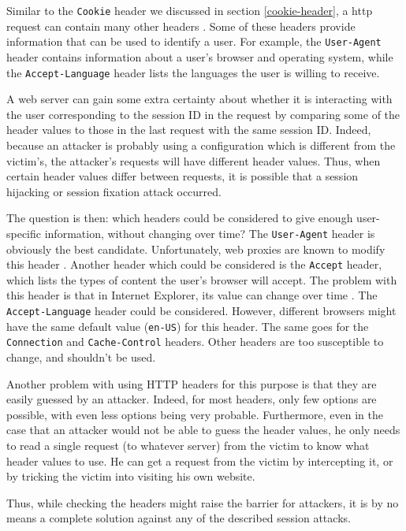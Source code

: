 Similar to the \texttt{Cookie} header we discussed in section \ref{cookie-header}, a \gls{http} request can contain many other headers \cite{rfc2616}. Some of these headers provide information that can be used to identify a user. For example, the \texttt{User-Agent} header contains information about a user's browser and operating system, while the \texttt{Accept-Language} header lists the languages the user is willing to receive.

A web server can gain some extra certainty about whether it is interacting with the user corresponding to the session ID in the request by comparing some of the header values to those in the last request with the same session ID. Indeed, because an attacker is probably using a configuration which is different from the victim's, the attacker's requests will have different header values. Thus, when certain header values differ between requests, it is possible that a session hijacking or session fixation attack occurred.

The question is then: which headers could be considered to give enough user-specific information, without changing over time? The \texttt{User-Agent} header is obviously the best candidate. Unfortunately, web proxies are known to modify this header \cite{ShiflettHijacking}. Another header which could be considered is the \texttt{Accept} header, which lists the types of content the user's browser will accept. The problem with this header is that in Internet Explorer, its value can change over time \cite{ShiflettHijacking}. The \texttt{Accept-Language} header could be considered. However, different browsers might have the same default value (\texttt{en-US}) for this header. The same goes for the \texttt{Connection} and \texttt{Cache-Control} headers. Other headers are too susceptible to change, and shouldn't be used.

Another problem with using HTTP headers for this purpose is that they are easily guessed by an attacker. Indeed, for most headers, only few options are possible, with even less options being very probable. Furthermore, even in the case that an attacker would not be able to guess the header values, he only needs to read a single request (to whatever server) from the victim to know what header values to use. He can get a request from the victim by intercepting it, or by tricking the victim into visiting his own website.

Thus, while checking the headers might raise the barrier for attackers, it is by no means a complete solution against any of the described session attacks.

